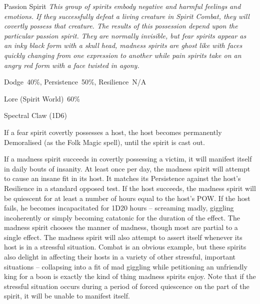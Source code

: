 \begin{monsterbox}{Passion Spirit}
	\textit{This group of spirits embody negative and harmful feelings and emotions. If they successfully defeat a living creature in Spirit Combat, they will covertly possess that creature. The results of this possession depend upon the particular passion spirit. They are normally invisible, but fear spirits appear as an inky black form with a skull head, madness spirits are ghost like with faces quickly changing from one expression to another while pain spirits take on an angry red form with a face twisted in agony.}\\
	\rpghline
	\basics[%
	powerpoints = 17,
	movementrate = 30m,
	plunderrating = 0
	]
	\rpghline%
	\stats[ %
		STR = -,
		CON = -,
		DEX = -,
		SIZ = -,
		INT = 2D6+3  (10),
		POW = 3D6+6  (17),
		CHA = 4D6    (14)
	]
	\rpghline%
	\begin{rpg-monsteraction}[Resistances]
		Dodge~40\%, Persistence~50\%, Resilience~N/A
	\end{rpg-monsteraction}
	\begin{rpg-monsteraction}[Knowledge]
		Lore (Spirit World)~60\%
	\end{rpg-monsteraction}
	\begin{rpg-monsteraction}
		Spectral Claw (1D6)
	\end{rpg-monsteraction}
	\begin{rpg-monsteraction}
		If a fear spirit covertly possesses a host, the host becomes permanently Demoralised (as the Folk Magic spell), until the spirit is cast out.
	\end{rpg-monsteraction}
	\begin{rpg-monsteraction}
		If a madness spirit succeeds in covertly possessing a victim, it will manifest itself in daily bouts of insanity. At least once per day, the madness spirit will attempt to cause an insane fit in its host. It matches its Persistence against the host’s Resilience in a standard opposed test. If the host succeeds, the madness spirit will be quiescent for at least a number of hours equal to the host’s POW. If the host fails, he becomes incapacitated for 1D20 hours – screaming madly, giggling incoherently or simply becoming catatonic for the duration of the effect. The madness spirit chooses the manner of madness, though most are partial to a single effect. The madness spirit will also attempt to assert itself whenever its host is in a stressful situation. Combat is an obvious example, but these spirits also delight in affecting their hosts in a variety of other stressful, important situations – collapsing into a fit of mad giggling while petitioning an unfriendly king for a boon is exactly the kind of thing madness spirits enjoy. Note that if the stressful situation occurs during a period of forced quiescence on the part of the spirit, it will be unable to manifest itself.

\end{rpg-monsteraction}
\end{monsterbox}
